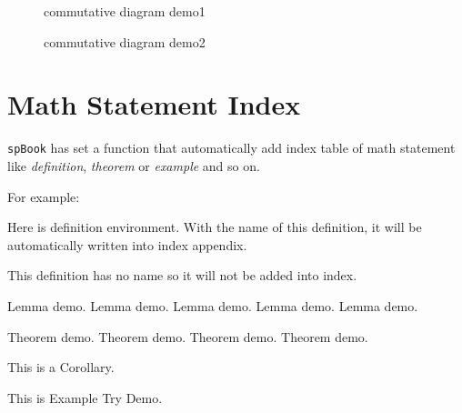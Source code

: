         \begin{figure}[H]
            \centering
            \caption{commutative diagram demo1}
        \end{figure}
        \begin{figure}[H]
            \caption{commutative diagram demo2}
        \end{figure}

    \section{Math Statement Index}
        \texttt{spBook} has set a function that automatically add index table of math statement like \emph{definition}, \emph{theorem} or \emph{example} and so on.

        For example:
        \begin{definition}
            Here is definition environment. With the name of this definition, it will be automatically written into index appendix.
        \end{definition}
        \begin{definition}
            This definition has no name so it will not be added into index.
        \end{definition}
        \begin{lemma}
            Lemma demo. Lemma demo. Lemma demo. Lemma demo. Lemma demo.
        \end{lemma}
        \begin{theorem}
            Theorem demo. Theorem demo. Theorem demo. Theorem demo.
        \end{theorem}
        \begin{corollary}
            This is a Corollary.
        \end{corollary}
        \begin{example}
            This is Example Try Demo.
        \end{example}